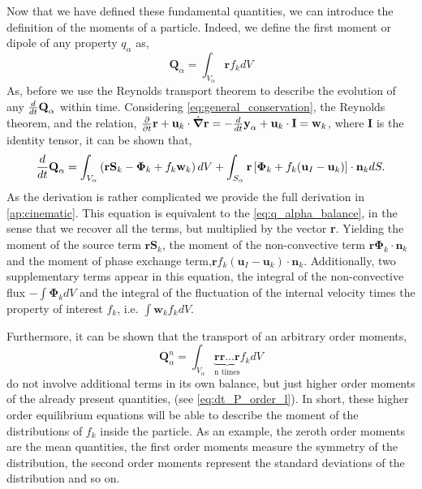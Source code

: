 Now that we have defined these fundamental quantities, we can introduce the definition of the moments of a particle.
Indeed, we define the first moment or dipole of any property $q_\alpha$ as,
\begin{equation*}
    \textbf{Q}_\alpha 
    = \int_{V_\alpha} \textbf{r} f_k dV
\end{equation*}
As, before we use the Reynolds transport theorem to describe the evolution of any $\frac{d}{d t} \textbf{Q}_\alpha$ within time. 
Considering \ref{eq:general_conservation}, the Reynolds theorem, and the relation,
$  \frac{\partial}{\partial t} \textbf{r}
+ \textbf{u}_k \cdot \hat{\bm{\nabla}} \textbf{r}
= - \frac{d}{dt} \textbf{y}_\alpha  + \textbf{u}_k \cdot \textbf{I}
= \textbf{w}_k$,
where $\textbf{I}$ is the identity tensor, it can be shown that, 
\begin{align}
    \frac{d}{d t} \textbf{Q}_\alpha
    = \int_{V_\alpha} \left( 
        \textbf{r} \textbf{S}_k 
        - \bm{\Phi}_k
        + f_k  \textbf{w}_k 
    \right) dV
    + \int_{S_\alpha} \textbf{r} \left[
        \bm{\Phi}_k
        + f_k (\textbf{u}_I-\textbf{u}_k)
    \right]\cdot \textbf{n}_k  dS.
    \label{eq:dt_Q_alpha}
\end{align}
As the derivation is rather complicated we provide the full derivation in \ref{ap:cinematic}. 
This equation is equivalent to the \ref{eq:q_alpha_balance}, in the sense that we recover all the terms, but multiplied by the vector \textbf{r}.
Yielding the moment of the source term $\textbf{rS}_k$, the moment of the non-convective term $\textbf{r}\mathbf{\Phi}_k\cdot\textbf{n}_k$ and the moment of phase exchange term,$\textbf{r} f_k (\textbf{u}_I-\textbf{u}_k)\cdot\textbf{n}_k$. 
Additionally, two supplementary terms appear in this equation, the integral of the non-convective flux $- \int \bm{\Phi}_k dV$ and the integral of the fluctuation of the internal velocity times the property of interest $f_k$, i.e. $\int \textbf{w}_k f_k dV$. 
 
Furthermore, it can be shown that the transport of an arbitrary order moments,
\begin{equation*}
    \textbf{Q}_\alpha^n
    = \int_{V_\alpha} \underbrace{
        \textbf{r}\textbf{r}\ldots\textbf{r}
    }_{
        \text{n times}
    }
    f_k dV
\end{equation*} 
do not involve additional terms in its own balance, but just higher order moments of the already present quantities, (see \ref{eq:dt_P_order_l}).
In short, these higher order equilibrium equations will be able to describe the moment of the distributions of $f_k$ inside the particle.
As an example, the zeroth order moments are the mean quantities, the first order moments measure the symmetry of the distribution, the second order moments represent the standard deviations of the distribution and so on.


